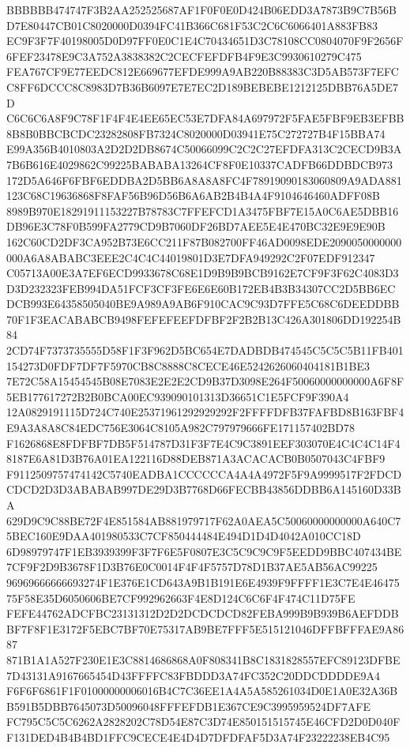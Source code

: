 \documentclass[UTF8,fontset=fandol,zihao=-4,a4paper]{ctexart}
\begin{document}
{{BBBBBB474747F3B2AA252525687AF1F0F0E0D424B06EDD3A7873B9C7B56BD7E80447CB01C8020000D0394FC41B366C681F53C2C6C6066401A883FB83
EC9F3F7F40198005D0D97FF0E0C1E4C70434651D3C78108CC0804070F9F2656F6FEF23478E9C3A752A3838382C2CECFEFDFB4F9E3C9930610279C475
FEA767CF9E77EEDC812E669677EFDE999A9AB220B88383C3D5AB573F7EFCC8FF6DCCC8C8983D7B36B6097E7E7EC2D189BEBEBE1212125DBB76A5DE7D
C6C6C6A8F9C78F1F4F4E4EE65EC53E7DFA84A697972F5FAE5FBF9EB3EFBB8B8B0BBCBCDC23282808FB7324C8020000D03941E75C272727B4F15BBA74
E99A356B4010803A2D2D2DB8674C50066099C2C2C27EFDFA313C2CECD9B3A7B6B616E4029862C99225BABABA13264CF8F0E10337CADFB66DDBDCB973
172D5A646F6FBF6EDDBA2D5BB6A8A8A8FC4F78919090183060809A9ADA881123C68C19636868F8FAF56B96D56B6A6AB2B4B4A4F9104646460ADFF08B
8989B970E18291911153227B78783C7FFEFCD1A3475FBF7E15A0C6AE5DBB16DB96E3C78F0B599FA2779CD9B7060DF26BD7AEE5E4E470BC32E9E9E90B
162C60CD2DF3CA952B73E6CC211F87B082700FF46AD0098EDE2090050000000000A6A8ABABC3EEE2C4C4C44019801D3E7DFA949292C2F07EDF912347
C05713A00E3A7EF6ECD9933678C68E1D9B9B9BCB9162E7CF9F3F62C4083D3D3D232323FEB994DA51FCF3CF3FE6E6E60B172EB4B3B34307CC2D5BB6EC
DCB993E64358505040BE9A989A9AB6F910CAC9C93D7FFE5C68C6DEEDDBB70F1F3EACABABCB9498FEFEFEEFDFBF2F2B2B13C426A301806DD192254B84
2CD74F7373735555D58F1F3F962D5BC654E7DADBDB474545C5C5C5B11FB401154273D0FDF7DF7F5970CB8C8888C8CECE46E5242626060404181B1BE3
7E72C58A15454545B08E7083E2E2E2CD9B37D3098E264F50060000000000A6F8F5EB177617272B2B0BCA00EC939090101313D36651C1E5FCF9F390A4
12A0829191115D724C740E25371961292929292F2FFFFDFB37FAFBD8B163FBF4E9A3A8A8C84EDC756E3064C8105A982C797979666FE171157402BD78
F1626868E8FDFBF7DB5F514787D31F3F7E4C9C3891EEF303070E4C4C4C14F48187E6A81D3B76A01EA122116D88DEB871A3ACACACB0B0507043C4FBF9
F9112509757474142C5740EADBA1CCCCCCA4A4A4972F5F9A9999517F2FDCDCDCD2D3D3ABABAB997DE29D3B7768D66FECBB43856DDBB6A145160D33BA
629D9C9C88BE72F4E851584AB881979717F62A0AEA5C50060000000000A640C75BEC160E9DAA401980533C7CF850444484E494D1D4D4042A010CC18D
6D98979747F1EB3939399F3F7F6E5F0807E3C5C9C9C9F5EEDD9BBC407434BE7CF9F2D9B3678F1D3B76E0C0014F4F4F5757D78D1B37AE5AB56AC99225
96969666666693274F1E376E1CD643A9B1B191E6E4939F9FFFF1E3C7E4E4647575F58E35D6050606BE7CF992962663F4E8D124C6C6F4F474C11D75FE
FEFE44762ADCFBC23131312D2D2DCDCDCD82FEBA999B9B939B6AEFDDBBF7F8F1E3172F5EBC7BF70E75317AB9BE7FFF5E515121046DFFBFFFAE9A8687
871B1A1A527F230E1E3C8814686868A0F808341B8C1831828557EFC89123DFBE7D43131A9167665454D43FFFFC83FBDDD3A74FC352C20DDCDDDDE9A4
F6F6F6861F1F01000000006016B4C7C36EE1A4A5A585261034D0E1A0E32A36BB591B5DBB7645073D50096048FFFEFDB1E367CE9C3995959524DF7AFE
FC795C5C5C6262A2828202C78D54E87C3D74E850151515745E46CFD2D0D040FF131DED4B4B4BD1FFC9CECE4E4D4D7DFDFAF5D3A74F23222238EB4C95
}}
\end{document}
